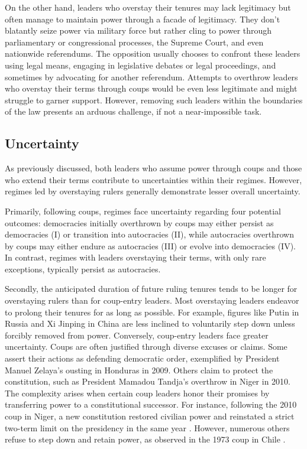 \documentclass[
  12pt,
  a4paper,
  12pt]{article}
\begin{document}
On the other hand, leaders who overstay their tenures may lack
legitimacy but often manage to maintain power through a facade of
legitimacy. They don't blatantly seize power via military force but
rather cling to power through parliamentary or congressional processes,
the Supreme Court, and even nationwide referendums. The opposition
usually chooses to confront these leaders using legal means, engaging in
legislative debates or legal proceedings, and sometimes by advocating
for another referendum. Attempts to overthrow leaders who overstay their
terms through coups would be even less legitimate and might struggle to
garner support. However, removing such leaders within the boundaries of
the law presents an arduous challenge, if not a near-impossible task.

\hypertarget{uncertainty}{%
\subsection{Uncertainty}\label{uncertainty}}

As previously discussed, both leaders who assume power through coups and
those who extend their terms contribute to uncertainties within their
regimes. However, regimes led by overstaying rulers generally
demonstrate lesser overall uncertainty.

Primarily, following coups, regimes face uncertainty regarding four
potential outcomes: democracies initially overthrown by coups may either
persist as democracies (I) or transition into autocracies (II), while
autocracies overthrown by coups may either endure as autocracies (III)
or evolve into democracies (IV). In contrast, regimes with leaders
overstaying their terms, with only rare exceptions, typically persist as
autocracies.

Secondly, the anticipated duration of future ruling tenures tends to be
longer for overstaying rulers than for coup-entry leaders. Most
overstaying leaders endeavor to prolong their tenures for as long as
possible. For example, figures like Putin in Russia and Xi Jinping in
China are less inclined to voluntarily step down unless forcibly removed
from power. Conversely, coup-entry leaders face greater uncertainty.
Coups are often justified through diverse excuses or claims. Some assert
their actions as defending democratic order, exemplified by President
Manuel Zelaya's ousting in Honduras in 2009. Others claim to protect the
constitution, such as President Mamadou Tandja's overthrow in Niger in
2010. The complexity arises when certain coup leaders honor their
promises by transferring power to a constitutional successor. For
instance, following the 2010 coup in Niger, a new constitution restored
civilian power and reinstated a strict two-term limit on the presidency
in the same year \citep{ginsburg2019}. However, numerous others refuse
to step down and retain power, as observed in the 1973 coup in Chile
\citep{ökten2022}.
\end{document}
